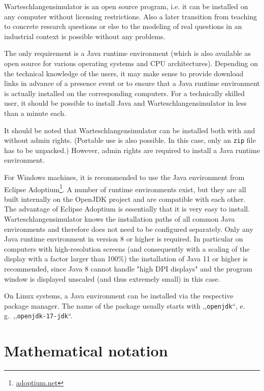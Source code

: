 \documentclass{svmono}
\begin{document}
Warteschlangensimulator is an open source program, i.e. it can be installed on any computer without licensing restrictions. Also a later transition from teaching to concrete research questions or else to the modeling of real questions in an industrial context is possible without any problems.

The only requirement is a Java runtime environment (which is also available as open source for various operating systems and CPU architectures). Depending on the technical knowledge of the users, it may make sense to provide download links in advance of a presence event or to ensure that a Java runtime environment is actually installed on the corresponding computers. For a technically skilled user, it should be possible to install Java and Warteschlangensimulator in less than a minute each.

It should be noted that Warteschlangensimulator can be installed both with and without admin rights. (Portable use is also possible. In this case, only an \texttt{zip} file has to be unpacked.) However, admin rights are required to install a Java runtime environment.

For Windows machines, it is recommended to use the Java environment from Eclipse Adoptium\footnote{\href{https://adoptium.net/}{adoptium.net}}. A number of runtime environments exist, but they are all built internally on the OpenJDK project and are compatible with each other. The advantage of Eclipse Adoptium is essentially that it is very easy to install. Warteschlangensimulator knows the installation paths of all common Java environments and therefore does not need to be configured separately. Only any Java runtime environment in version 8 or higher is required. In particular on computers with high-resolution screens (and consequently with a scaling of the display with a factor larger than 100\%) the installation of Java 11 or higher is recommended, since Java 8 cannot handle "high DPI displays" and the program window is displayed unscaled (and thus extremely small) in this case.

On Linux systems, a Java environment can be installed via the respective package manager. The name of the package usually starts with ,,\texttt{openjdk}``, e.\,g.\ ,,\texttt{openjdk-17-jdk}``.



\chapter{Mathematical notation}
\end{document}
